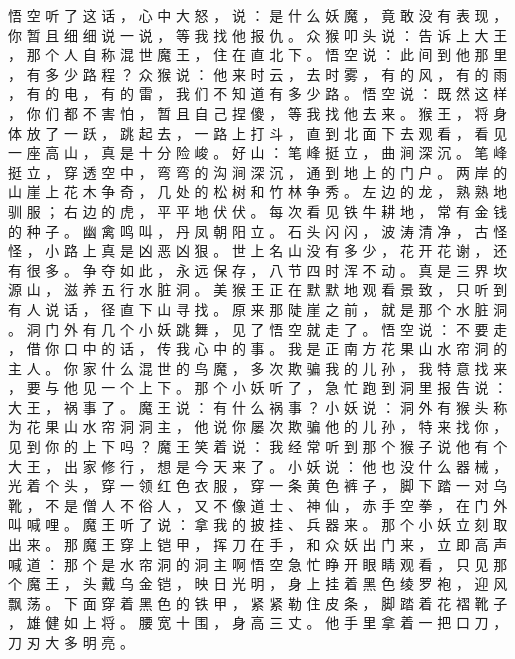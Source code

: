 {悟 空 听 了 这 话 ， 心 中 大 怒 ， 说 ： 是 什 么 妖 魔 ， 竟 敢 没 有 表 现 ， 你 暂 且 细 细 说 一 说 ， 等 我 找 他 报 仇 。
众 猴 叩 头 说 ： 告 诉 上 大 王 ， 那 个 人 自 称 混 世 魔 王 ， 住 在 直 北 下 。
悟 空 说 ： 此 间 到 他 那 里 ， 有 多 少 路 程 ？ 众 猴 说 ： 他 来 时 云 ， 去 时 雾 ， 有 的 风 ， 有 的 雨 ， 有 的 电 ， 有 的 雷 ， 我 们 不 知 道 有 多 少 路 。
悟 空 说 ： 既 然 这 样 ， 你 们 都 不 害 怕 ， 暂 且 自 己 捏 傻 ， 等 我 找 他 去 来 。
猴 王 ， 将 身 体 放 了 一 跃 ， 跳 起 去 ， 一 路 上 打 斗 ， 直 到 北 面 下 去 观 看 ， 看 见 一 座 高 山 ， 真 是 十 分 险 峻 。
好 山 ： 笔 峰 挺 立 ， 曲 涧 深 沉 。
笔 峰 挺 立 ， 穿 透 空 中 ， 弯 弯 的 沟 涧 深 沉 ， 通 到 地 上 的 门 户 。
两 岸 的 山 崖 上 花 木 争 奇 ， 几 处 的 松 树 和 竹 林 争 秀 。
左 边 的 龙 ， 熟 熟 地 驯 服 ； 右 边 的 虎 ， 平 平 地 伏 伏 。
每 次 看 见 铁 牛 耕 地 ， 常 有 金 钱 的 种 子 。
幽 禽 鸣 叫 ， 丹 凤 朝 阳 立 。
石 头 闪 闪 ， 波 涛 清 净 ， 古 怪 怪 ， 小 路 上 真 是 凶 恶 凶 狠 。
世 上 名 山 没 有 多 少 ， 花 开 花 谢 ， 还 有 很 多 。
争 夺 如 此 ， 永 远 保 存 ， 八 节 四 时 浑 不 动 。
真 是 三 界 坎 源 山 ， 滋 养 五 行 水 脏 洞 。
美 猴 王 正 在 默 默 地 观 看 景 致 ， 只 听 到 有 人 说 话 ， 径 直 下 山 寻 找 。
原 来 那 陡 崖 之 前 ， 就 是 那 个 水 脏 洞 。
洞 门 外 有 几 个 小 妖 跳 舞 ， 见 了 悟 空 就 走 了 。
悟 空 说 ： 不 要 走 ， 借 你 口 中 的 话 ， 传 我 心 中 的 事 。
我 是 正 南 方 花 果 山 水 帘 洞 的 主 人 。
你 家 什 么 混 世 的 鸟 魔 ， 多 次 欺 骗 我 的 儿 孙 ， 我 特 意 找 来 ， 要 与 他 见 一 个 上 下 。
那 个 小 妖 听 了 ， 急 忙 跑 到 洞 里 报 告 说 ： 大 王 ， 祸 事 了 。 魔 王 说 ： 有 什 么 祸 事 ？ 小 妖 说 ： 洞 外 有 猴 头 称 为 花 果 山 水 帘 洞 洞 主 ， 他 说 你 屡 次 欺 骗 他 的 儿 孙 ， 特 来 找 你 ， 见 到 你 的 上 下 吗 ？
魔 王 笑 着 说 ： 我 经 常 听 到 那 个 猴 子 说 他 有 个 大 王 ， 出 家 修 行 ， 想 是 今 天 来 了 。
小 妖 说 ： 他 也 没 什 么 器 械 ， 光 着 个 头 ， 穿 一 领 红 色 衣 服 ， 穿 一 条 黄 色 裤 子 ， 脚 下 踏 一 对 乌 靴 ， 不 是 僧 人 不 俗 人 ， 又 不 像 道 士 、 神 仙 ， 赤 手 空 拳 ， 在 门 外 叫 喊 哩 。
魔 王 听 了 说 ： 拿 我 的 披 挂 、 兵 器 来 。
那 个 小 妖 立 刻 取 出 来 。
那 魔 王 穿 上 铠 甲 ， 挥 刀 在 手 ， 和 众 妖 出 门 来 ， 立 即 高 声 喊 道 ： 那 个 是 水 帘 洞 的 洞 主 啊 悟 空 急 忙 睁 开 眼 睛 观 看 ， 只 见 那 个 魔 王 ， 头 戴 乌 金 铠 ， 映 日 光 明 ， 身 上 挂 着 黑 色 绫 罗 袍 ， 迎 风 飘 荡 。
下 面 穿 着 黑 色 的 铁 甲 ， 紧 紧 勒 住 皮 条 ， 脚 踏 着 花 褶 靴 子 ， 雄 健 如 上 将 。
腰 宽 十 围 ， 身 高 三 丈 。
他 手 里 拿 着 一 把 口 刀 ， 刀 刃 大 多 明 亮 。
}
